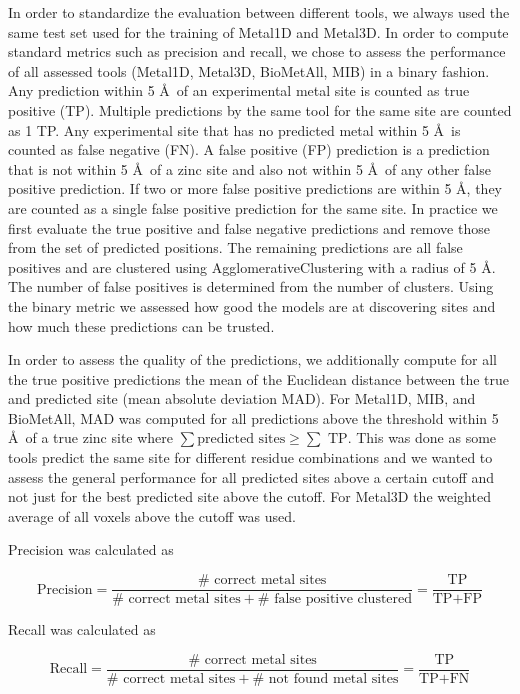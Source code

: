 \documentclass[ lineno,
  9pt]{elife}
\begin{document}
In order to standardize the evaluation between different tools, we always used the same test set used for the training of Metal1D and Metal3D. In order to compute standard metrics such as precision and recall, we chose to assess the performance of all assessed tools (Metal1D, Metal3D, BioMetAll, MIB) in a binary fashion. Any prediction within 5 \AA\, of an experimental metal site is counted as true positive (TP). Multiple predictions by the same tool for the same site are counted as 1 TP. Any experimental site that has no predicted metal within 5 \AA\, is counted as false negative (FN). A false positive (FP) prediction is a prediction that is not within 5 \AA\, of a zinc site and also not within 5 \AA\, of any other false positive prediction. If two or more false positive predictions are within 5 \AA , they are counted as a single false positive prediction for the same site. In practice we first evaluate the true positive and false negative predictions and remove those from the set of predicted positions. The remaining predictions are all false positives and are clustered using AgglomerativeClustering with a radius of 5 \AA . The number of false positives is determined from the number of clusters. Using the binary metric we assessed how good the models are at discovering sites and how much these predictions can be trusted.

In order to assess the quality of the predictions, we additionally compute for all the true positive predictions the mean of the Euclidean distance between the true and predicted site (mean absolute deviation MAD). For Metal1D, MIB, and BioMetAll, MAD was computed for all predictions above the threshold within 5 \AA\, of a true zinc site where \(\sum\text{predicted sites} \geq \sum\text{ TP}\). This was done as some tools predict the same site for different residue combinations and we wanted to assess the general performance for all predicted sites above a certain cutoff and not just for the best predicted site above the cutoff. For Metal3D the weighted average of all voxels above the cutoff was used.

Precision was calculated as

\[
\text{Precision} =\frac{\#\text{ correct metal sites}}{\#\text{ correct metal sites} + \#\text{ false positive clustered}} = \frac{\text{TP}}{\text{TP}+\text{FP}}
\]

Recall was calculated as

\[
\text{Recall} =\frac{\#\text{ correct metal sites}}{\#\text{ correct metal sites} + \#\text{ not found metal sites}}  = \frac{\text{TP}}{\text{TP}+\text{FN}}
\]
\end{document}
